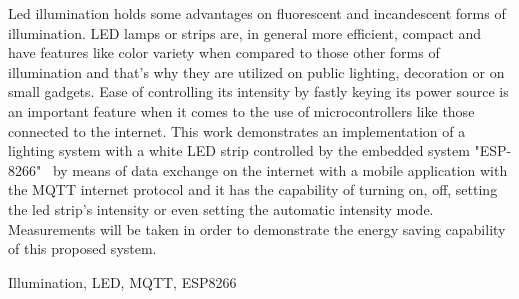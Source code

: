 Led illumination holds some advantages on fluorescent and incandescent forms of illumination. LED lamps or strips are, in general more efficient, compact and have features like color variety when compared to those other forms of illumination and that's why they are utilized on public lighting, decoration or on small gadgets. Ease of controlling its intensity by fastly keying its power source is an important feature when it comes to the use of microcontrollers like those connected to the internet. This work demonstrates an implementation of a lighting system with a white LED strip controlled by the embedded system "ESP-8266"  by means of data exchange on the internet with a mobile application with the MQTT internet protocol and it has the capability of turning on, off, setting the led strip's intensity or even setting the automatic intensity mode. Measurements will be taken in order to demonstrate the energy saving capability of this proposed system. 

\begin{keywords}
    Illumination, LED, MQTT, ESP8266
\end{keywords}